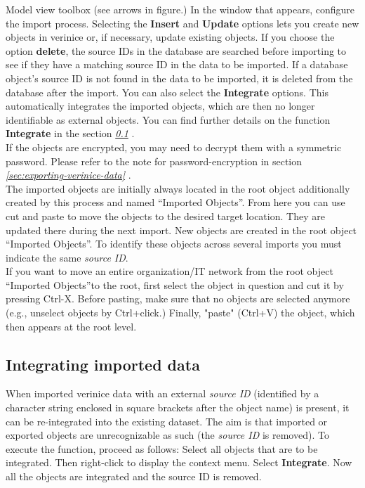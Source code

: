 \documentclass[a4paper,10pt]{book}
\begin{document}
Model view toolbox (see arrows in figure.) In the window that appears, configure the import process. Selecting the
\textbf{Insert} and \textbf{Update} options lets you create new objects in verinice or, if necessary, update existing objects.
If you choose the option \textbf{delete}, the source IDs in the database are searched before importing to see if they have a matching source ID in the data to be imported.
If a database object’s source ID is not found in the data to be imported, it is deleted from the database after the import.
You can also select the \textbf{Integrate} options. This automatically integrates the imported objects, which are then no longer
identifiable as external objects. You can find further details on the function \textbf{Integrate} in the section {\em \ref{Integrating imported data} }.
\newline\\
If the objects are encrypted, you may need to decrypt them with a symmetric password. Please refer to the note for password-encryption in section {\em
\ref{sec:exporting-verinice-data} }.\newline\\
The imported objects are initially always located in the root object additionally created by this process and named
``Imported Objects''. From here you can use cut and paste to move the objects to the desired target location. They are
updated there during the next import. New objects are created in the root object ``Imported Objects''. To identify these objects across several
imports you must indicate the same \textit{source ID}.
\newline\\
If you want to move an entire organization/IT network from the root object ``Imported Objects''to the root, first select the object in
question and cut it by pressing Ctrl-X. Before pasting, make sure that no objects are selected anymore (e.g.,
unselect objects by Ctrl+click.) Finally, "paste" (Ctrl+V) the object, which then appears at the root level.

\subsection{Integrating imported data} \label{Integrating imported data}
When imported verinice data with an external \textit{source ID} (identified by a character string enclosed in square brackets after the object name) is present, it can be re-integrated into the existing dataset.
The aim is that imported or exported objects are unrecognizable as such (the \textit{source ID} is removed).  To execute the function, proceed as follows: Select all objects that are to be integrated. Then right-click to display the context menu.
Select \textbf{Integrate}. Now all the objects are integrated and the source ID is removed.
\end{document}
